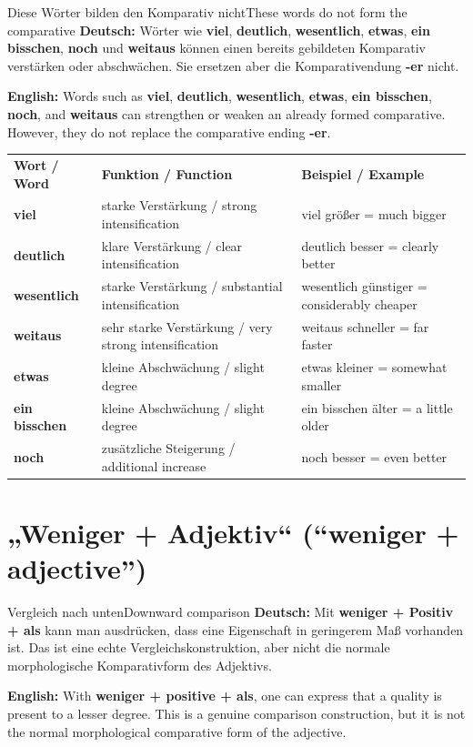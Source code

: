 \documentclass[a4paper,11pt]{article}
\newcommand{\GermanText}[1]{\textbf{Deutsch: }#1\par}
\newcommand{\EnglishText}[1]{{\small\color{SoftGray}\textbf{English: }#1\par}}
\begin{document}
\begin{grammarentry}{Diese Wörter bilden den Komparativ nicht}{These words do not form the comparative}
\GermanText{Wörter wie \textbf{viel}, \textbf{deutlich}, \textbf{wesentlich}, \textbf{etwas}, \textbf{ein bisschen}, \textbf{noch} und \textbf{weitaus} können einen bereits gebildeten Komparativ verstärken oder abschwächen. Sie ersetzen aber die Komparativendung \textbf{-er} nicht.}
\EnglishText{Words such as \textbf{viel}, \textbf{deutlich}, \textbf{wesentlich}, \textbf{etwas}, \textbf{ein bisschen}, \textbf{noch}, and \textbf{weitaus} can strengthen or weaken an already formed comparative. However, they do not replace the comparative ending \textbf{-er}.}
\end{grammarentry}

\begin{longtable}{>{\bfseries}p{3.5cm}|p{4.5cm}|p{5.5cm}}
\rowcolor{HeaderBlueDark}
\color{white}\textbf{Wort / Word} &
\color{white}\textbf{Funktion / Function} &
\color{white}\textbf{Beispiel / Example} \\
viel & starke Verstärkung / strong intensification & viel größer = much bigger \\
deutlich & klare Verstärkung / clear intensification & deutlich besser = clearly better \\
wesentlich & starke Verstärkung / substantial intensification & wesentlich günstiger = considerably cheaper \\
weitaus & sehr starke Verstärkung / very strong intensification & weitaus schneller = far faster \\
etwas & kleine Abschwächung / slight degree & etwas kleiner = somewhat smaller \\
ein bisschen & kleine Abschwächung / slight degree & ein bisschen älter = a little older \\
noch & zusätzliche Steigerung / additional increase & noch besser = even better \\
\end{longtable}

\section{„Weniger + Adjektiv“ \textnormal{(“weniger + adjective”)}}

\begin{grammarentry}{Vergleich nach unten}{Downward comparison}
\GermanText{Mit \textbf{weniger + Positiv + als} kann man ausdrücken, dass eine Eigenschaft in geringerem Maß vorhanden ist. Das ist eine echte Vergleichskonstruktion, aber nicht die normale morphologische Komparativform des Adjektivs.}
\EnglishText{With \textbf{weniger + positive + als}, one can express that a quality is present to a lesser degree. This is a genuine comparison construction, but it is not the normal morphological comparative form of the adjective.}
\end{grammarentry}
\end{document}
